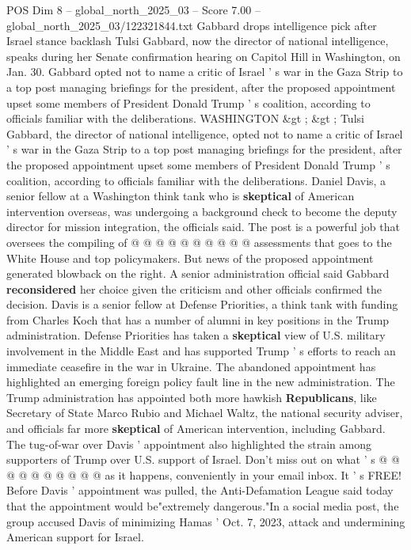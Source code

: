 \begin{textsample}{POS Dim 8 – global\_north\_2025\_03 – Score 7.00 – global\_north\_2025\_03/122321844.txt}  \label{ex:f8_pos_332}
Gabbard drops intelligence pick after Israel stance backlash Tulsi Gabbard, now the director of national intelligence, speaks during her Senate confirmation hearing on Capitol Hill in Washington, on Jan. 30.
Gabbard opted not to name a critic of Israel ' s war in the Gaza Strip to a top post managing briefings for the president, after the proposed appointment upset some members of President Donald Trump ' s coalition, according to officials familiar with the deliberations.
WASHINGTON \&gt ; \&gt ; Tulsi Gabbard, the director of national intelligence, opted not to name a critic of Israel ' s war in the Gaza Strip to a top post managing briefings for the president, after the proposed appointment upset some members of President Donald Trump ' s coalition, according to officials familiar with the deliberations.
Daniel Davis, a senior fellow at a Washington think tank who is \textbf{skeptical} of American intervention overseas, was undergoing a background check to become the deputy director for mission integration, the officials said.
The post is a powerful job that oversees the compiling of @ @ @ @ @ @ @ @ @ @ assessments that goes to the White House and top policymakers.
But news of the proposed appointment generated blowback on the right.
A senior administration official said Gabbard \textbf{reconsidered} her choice given the criticism and other officials confirmed the decision.
Davis is a senior fellow at Defense Priorities, a think tank with funding from Charles Koch that has a number of alumni in key positions in the Trump administration.
Defense Priorities has taken a \textbf{skeptical} view of U.S. military involvement in the Middle East and has supported Trump ' s efforts to reach an immediate ceasefire in the war in Ukraine.
The abandoned appointment has highlighted an emerging foreign policy fault line in the new administration.
The Trump administration has appointed both more hawkish \textbf{Republicans}, like Secretary of State Marco Rubio and Michael Waltz, the national security adviser, and officials far more \textbf{skeptical} of American intervention, including Gabbard.
The tug-of-war over Davis ' appointment also highlighted the strain among supporters of Trump over U.S. support of Israel.
Don't miss out on what ' s @ @ @ @ @ @ @ @ @ @ as it happens, conveniently in your email inbox.
It ' s FREE!
Before Davis ' appointment was pulled, the Anti-Defamation League said today that the appointment would be"extremely dangerous."In a social media post, the group accused Davis of minimizing Hamas ' Oct. 7, 2023, attack and undermining American support for Israel.

\end{textsample}
